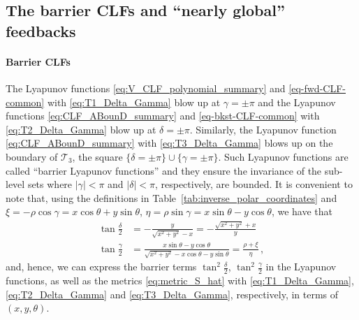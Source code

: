 \documentclass[journal,twoside,web]{ieeecolor}
\theoremstyle{definition}
\begin{document}
\subsection{The barrier CLFs and ``nearly global'' feedbacks}\label{sec:barrier}

\paragraph{Barrier CLFs} The Lyapunov functions \eqref{eq:V_CLF_polynomial_summary} and \eqref{eq-fwd-CLF-common} with \eqref{eq:T1_Delta_Gamma} 
blow up at $\gamma=\pm \pi$ and the Lyapunov functions 
\eqref{eq:CLF_ABounD_summary} and
\eqref{eq-bkst-CLF-common} with \eqref{eq:T2_Delta_Gamma} blow up at $\delta=\pm \pi$.  Similarly, the Lyapunov function \eqref{eq:CLF_ABounD_summary} with \eqref{eq:T3_Delta_Gamma} blows up on the boundary of $\mathcal{T}_3$, the square $\{\delta=\pm\pi\}\cup \{\gamma=\pm\pi\}$. 
Such Lyapunov functions are called ``barrier Lyapunov functions'' and they ensure the invariance of the sub-level sets where $|\gamma|  < \pi$ and $|\delta| < \pi$, respectively, are bounded. 
It is convenient to note that, using the definitions in Table~\ref{tab:inverse_polar_coordinates} and 
$\xi = - \rho\cos\gamma = x \cos\theta +y\sin\theta$,  
$\eta = \rho \sin\gamma= x \sin\theta -y\cos\theta %
$,
we have that
\begin{align}
\tan\frac{\delta}{2} &= -\frac{y}{\sqrt{x^2+y^2}-x}=-\frac{\sqrt{x^2+y^2}+x}{y}\label{eq:tan_delta_cart}
\\
\tan\frac{\gamma}{2} &= \frac{x\sin\theta-y\cos\theta}{\sqrt{x^2+y^2}-x\cos\theta-y\sin\theta}
= \frac{\rho+\xi}{\eta}\label{eq:tan_gamma_cart}
\,,
\end{align}
and, hence, we can express the barrier  terms $\tan^2\frac{\delta}{2}$, $\tan^2\frac{\gamma}{2}$ in the Lyapunov functions, as well as the metrics \eqref{eq:metric_S_hat} with \eqref{eq:T1_Delta_Gamma}, \eqref{eq:T2_Delta_Gamma} and \eqref{eq:T3_Delta_Gamma}, respectively, in terms of $(x,y,\theta)$. 
\end{document}
